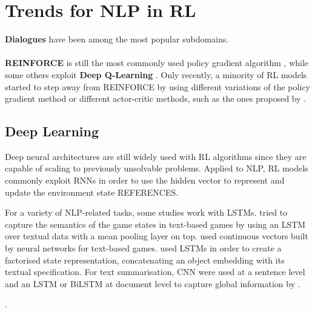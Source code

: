 \documentclass[11pt,a4paper]{article}
\begin{document}
\section{Trends for NLP in RL}
\textbf{Dialogues} have been among the most popular subdomains.\\\\ 
\textbf{REINFORCE} is still the most commonly used policy gradient algorithm \citep{yasui-etal-2019, zhang-2018, hu-etal-2018-playing, godin-etal-2019-learning, huang-etal-2018-neural, mao-etal-2018-end, ranzato2015sequence, wu-etal-2018-study, clark-manning-2016-deep,yogatama-2017, guu-etal-2017-language, zeng-2018}, while some others exploit \textbf{Deep Q-Learning} \citep{narasimhan-etal-2016-improving, mosallanezhad-etal-2019-deep, ling-etal-2017-learning}. Only recently, a minority of RL models started to step away from REINFORCE by using different variations of the policy gradient method \citep{branavan-2009, li-etal-2018-paraphrase, li-etal-2016-deep, le-fokkens-2017-tackling} or different actor-critic methods, such as the ones proposed by \citet{dethlefs-cuayahuitl-2011,grissom-ii-etal-2014-dont, he-etal-2016-deep-reinforcement, chen-bansal-2018-fast, goyal-2019}. 

\subsection{Deep Learning}
Deep neural architectures are still widely used with RL algorithms since they are capable of scaling to previously unsolvable problems. Applied to NLP, RL models commonly exploit RNNs in order to use the hidden vector to represent and update the environment state REFERENCES. 

For a variety of NLP-related tasks, some studies work with LSTMs. \citet{narasimhan-etal-2016-improving} tried to capture the semantics of the game states in text-based games by using an LSTM over textual data with a mean pooling layer on top. \citet{he-etal-2016-deep-reinforcement} used continuous vectors built by neural networks for text-based games. \citet{narasimhan-2018} used LSTMs in order to create a factorised state representation, concatenating an object embedding with its textual specification. For text summarisation, CNN were used at a sentence level and an LSTM or BiLSTM at document level to capture global information by \citet{chen-bansal-2018-fast}. 

\citet{yasui-etal-2019, zhang-2018, li-etal-2016-deep, ranzato2015sequence}. 
\end{document}
